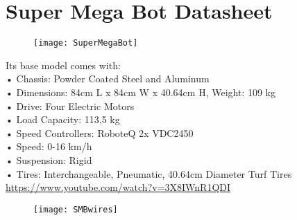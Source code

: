 
\section{Super Mega Bot Datasheet}
\label{AppA}



\begin{figure}[h]
	\begin{center} 
		\texttt{[image: SuperMegaBot]}
		\centering
		\label{fig:SuperMegaBot} 
	\end{center}
\end{figure}


Its base model comes with:\\
•	Chassis: Powder Coated Steel and Aluminum \\
•	Dimensions: 84cm L x 84cm W x 40.64cm H, Weight: 109 kg\\
•	Drive: Four Electric Motors\\
•	Load Capacity: 113,5 kg\\
•	Speed Controllers: RoboteQ 2x VDC2450\\
•	Speed: 0-16 km/h \\
•	Suspension: Rigid\\
•	Tires: Interchangeable, Pneumatic, 40.64cm Diameter Turf Tires\\
\url{https://www.youtube.com/watch?v=3X8IWnR1QDI}



\begin{figure}[h]
	\begin{center} 
		\texttt{[image: SMBwires]}
		\centering
		\label{SMB Wiring} 
	\end{center}
\end{figure}